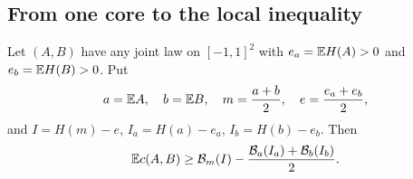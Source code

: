 \subsection{From one core to the local inequality}

\begin{theorem}
\label{reserve:joining}
Let $(A,B)$ have any joint law on $[-1,1]^2$ with
$e_a=\mathbb E H(A)>0$ and $e_b=\mathbb E H(B)>0$.  Put
\[
 a=\mathbb E A,\quad b=\mathbb E B,\quad m=\frac{a+b}{2},
 \quad e=\frac{e_a+e_b}{2},
\]
and $I=H(m)-e$, $I_a=H(a)-e_a$, $I_b=H(b)-e_b$.  Then
\begin{equation}
 \mathbb E c(A,B)\ge
 \mathcal B_m(I)-\frac{\mathcal B_a(I_a)+\mathcal B_b(I_b)}2.
 \label{reserve:local-bound}
\end{equation}
\end{theorem}

